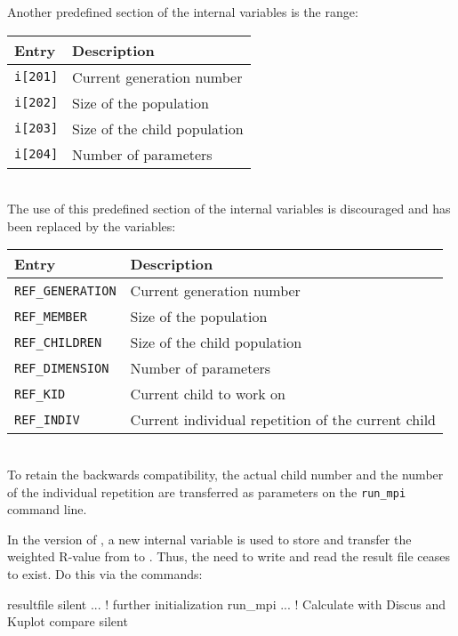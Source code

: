 Another predefined section of the internal variables is the range:\\
\begin{tabularx}{\textwidth}{|p{30mm}|X|}
  \hline
  {\bf Entry } & {\bf Description} \\
  \hline
  {\tt i[201]} & Current generation number \\
  \hline
  {\tt i[202]} & Size of the population \\
  \hline
  {\tt i[203]} & Size of the child population \\
  \hline
  {\tt i[204]} & Number of parameters \\
  \hline
\end{tabularx}
{ } \\
The use of this predefined  section of the internal variables 
is discouraged and has been replaced by the variables:\\
\begin{tabularx}{\textwidth}{|p{35mm}|X|}
  \hline
  {\bf Entry } & {\bf Description} \\
  \hline
  {\tt REF\_GENERATION} & Current generation number \\
  \hline
  {\tt REF\_MEMBER} & Size of the population \\
  \hline
  {\tt REF\_CHILDREN} & Size of the child population \\
  \hline
  {\tt REF\_DIMENSION} & Number of parameters \\
  \hline
  {\tt REF\_KID} & Current child to work on \\
  \hline
  {\tt REF\_INDIV} & Current individual repetition of the current child \\
  \hline
\end{tabularx}
{ } \\
To retain the backwards compatibility, the actual child number and the number 
of the individual repetition are transferred as parameters on 
the {\tt run\_mpi} command line.

In the \Suite version of \kuplot, a new internal variable is used to store
and transfer the weighted R-value from \Kuplot to \diffev. Thus, the need
to write and read the result file ceases to exist. Do this via the commands:

\begin{MacVerbatim}
resultfile  silent
...                ! further initialization
run_mpi ...        ! Calculate with Discus and Kuplot
compare silent
\end{MacVerbatim}


